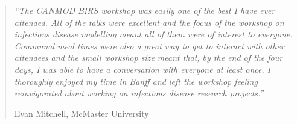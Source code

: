 \begin{quote}
{\it ``The CANMOD BIRS workshop was easily one of the best I have ever attended. All of the talks were excellent and the focus of the workshop on infectious disease modelling meant all of them were of interest to everyone. Communal meal times were also a great way to get to interact with other attendees and the small workshop size meant that, by the end of the four days, I was able to have a conversation with everyone at least once. I thoroughly enjoyed my time in Banff and left the workshop feeling reinvigorated about working on infectious disease research projects.''}

\hfill Evan Mitchell, McMaster University
\end{quote}